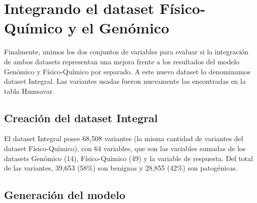 \newpage


\section{Integrando el dataset Físico-Químico y el Genómico}

Finalmente, unimos los dos conjuntos de variables para evaluar si la integración de ambos datasets representan una mejora frente a los resultados del modelo Genómico y Físico-Químico por separado. A este nuevo dataset lo denominamos dataset Integral. Las variantes usadas fueron nuevamente las encontradas en la tabla Humsavar. 

\subsection{Creación del dataset Integral}

El dataset Integral posee 68,508 variantes (la misma cantidad de variantes del dataset Físico-Químico), con 64 variables, que son las variables sumadas de los datasets Genómico (14), Físico-Químico (49) y la variable de respuesta. Del total de las variantes, 39,653 (58\%) son benignas y 28,855 (42\%) son patogénicas. 

\subsection{Generación del modelo}

